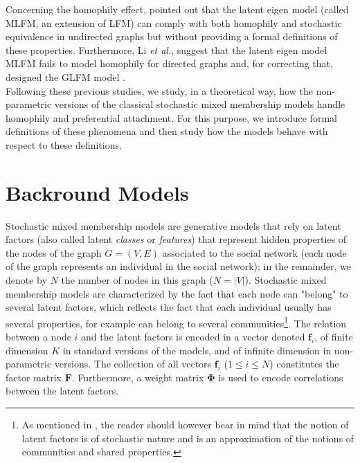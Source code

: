\documentclass[conference]{IEEEtran}
\newcommand{\mat}[1]{\mathbf{#1}}
\begin{document}
Concerning the homophily effect, \cite{hoff2008modeling} pointed out that the latent eigen model (called MLFM, an extension of LFM) can comply with both homophily and stochastic equivalence in undirected graphs but without providing a formal definitions of these properties. Furthermore, Li \textit{et al.}, suggest that the latent eigen model  MLFM fails to model homophily  for directed graphs and, for correcting that, designed the GLFM model \cite{Li11}.~\\

Following these previous studies, we study, in a theoretical way, how the non-parametric versions of the classical stochastic mixed membership models handle homophily and preferential attachment. For this purpose, we introduce formal definitions of these phenomena and then study how the models behave with respect  to these definitions.

\section{Backround Models}
\label{sec:background}

Stochastic mixed membership models are generative models that rely on latent factors (also called latent \textit{classes} or \textit{features}) that represent hidden properties of the nodes of the graph $G=(V,E)$ associated to the social network (each node of the graph represents an individual in the social network); in the remainder, we denote by $N$ the number of nodes in this graph ($N=|V|$). Stochastic mixed membership models are characterized by the fact that each node can "belong" to several latent factors, which reflects the fact that each individual usually has several properties, for example can belong to several communities\footnote{As mentioned in \cite{goldenberg2010survey}, the reader should however bear in mind that the notion of latent factors is of stochastic nature and is an approximation of the notions of communities and shared properties.}. The relation between a node $i$ and the latent factors is encoded in a vector denoted $\mat{f}_{i}$, of finite dimension $K$ in standard versions of the models, and of infinite dimension in  non-parametric versions. The collection of all vectors $\mat{f}_{i}$ ($1 \le i \le N$) constitutes the factor matrix $\mat{F}$. Furthermore, a weight matrix $\mat{\Phi}$ is used to encode correlations between the latent factors.~\\
\end{document}

